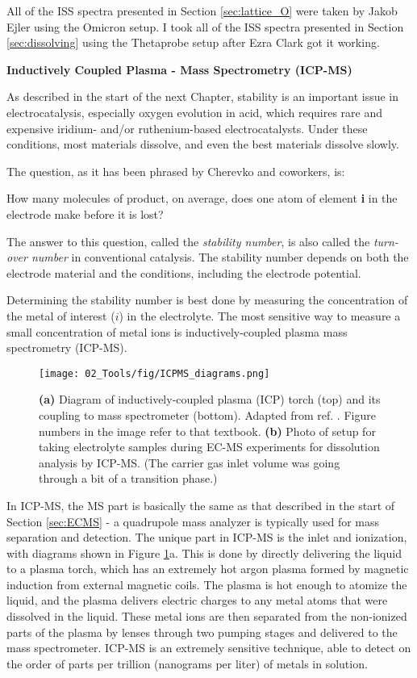 All of the ISS spectra presented in Section \ref{sec:lattice_O} were taken by Jakob Ejler using the Omicron setup. I took all of the ISS spectra presented in Section \ref{sec:dissolving} using the Thetaprobe setup after Ezra Clark got it working.

\vspace{5mm}
\textbf{Inductively Coupled Plasma - Mass Spectrometry (ICP-MS)}

As described in the start of the next Chapter, stability is an important issue in electrocatalysis, especially oxygen evolution in acid, which requires rare and expensive iridium- and/or ruthenium-based electrocatalysts. Under these conditions, most materials dissolve, and even the best materials dissolve slowly.

The question, as it has been phrased by Cherevko and coworkers\cite{Geiger2018}, is:
\begin{question}
	How many molecules of product, on average, does one atom of element \textbf{i} in the electrode make before it is lost?
\end{question}
The answer to this question, called the \textit{stability number}, is also called the \textit{turn-over number} in conventional catalysis. The stability number depends on both the electrode material and the conditions, including the electrode potential.

Determining the stability number is best done by measuring the concentration of the metal of interest ($i$) in the electrolyte. The most sensitive way to measure a small concentration of metal ions is inductively-coupled plasma mass spectrometry (ICP-MS)\cite{Harris2010, Frydendal2014}.
\begin{figure}[h!]
	\centering
	\texttt{[image: 02\_Tools/fig/ICPMS\_diagrams.png]}
	\caption{\textbf{(a)} Diagram of inductively-coupled plasma (ICP) torch (top) and its coupling to mass spectrometer (bottom). Adapted from ref. . Figure numbers in the image refer to that textbook. \textbf{(b)} Photo of setup for taking electrolyte samples during EC-MS experiments for dissolution analysis by ICP-MS. (The carrier gas inlet volume was going through a bit of a transition phase.) }
	\label{fig:ICPMS}
\end{figure}
In ICP-MS, the MS part is basically the same as that described in the start of Section \ref{sec:ECMS} - a quadrupole mass analyzer is typically used for mass separation and detection. The unique part in ICP-MS is the inlet and ionization\cite{Gross2007}, with diagrams shown in Figure \ref{fig:ICPMS}a. This is done by directly delivering the liquid to a plasma torch, which has an extremely hot argon plasma formed by magnetic induction from external magnetic coils. The plasma is hot enough to atomize the liquid, and the plasma delivers electric charges to any metal atoms that were dissolved in the liquid. These metal ions are then separated from the non-ionized parts of the plasma by lenses through two pumping stages and delivered to the mass spectrometer. ICP-MS is an extremely sensitive technique, able to detect on the order of parts per trillion (nanograms per liter) of metals in solution.

